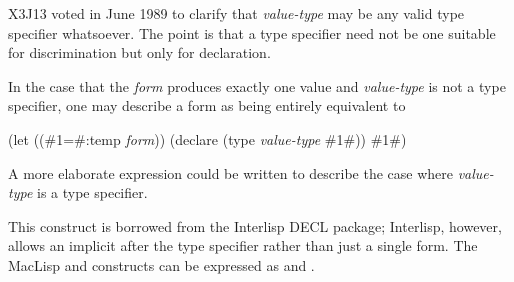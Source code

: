 \begin{defspec}
\begin{newer}
X3J13 voted in June 1989 
to clarify that \emph{value-type} may be any valid type specifier whatsoever.
The point is that a type specifier need not be one suitable for
discrimination but only for declaration.

In the case that the \emph{form} produces exactly one value and \emph{value-type}
is not a  type specifier, one may describe a  form
as being entirely equivalent to
\begin{lisp}
(let ((\#1=\#:temp \emph{form})) (declare (type \emph{value-type} \#1\#)) \#1\#)
\end{lisp}
A more elaborate expression could be written to describe the case where
\emph{value-type} is a  type specifier.
\end{newer}

\beforenoterule
\begin{incompatibility}
This construct is borrowed from the Interlisp DECL
package; Interlisp, however, allows an implicit  after the type
specifier rather than just a single form.  The MacLisp 
and  constructs can be expressed as 
and .
\end{incompatibility}
\afternoterule
\end{defspec}

